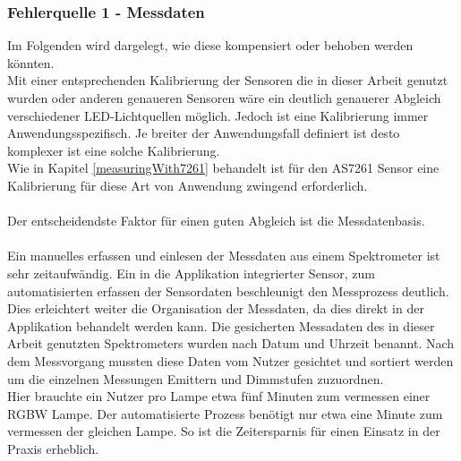 \documentclass[11pt]{scrartcl}
\begin{document}
\subsubsection{Fehlerquelle 1 - Messdaten}
Im Folgenden wird dargelegt, wie diese kompensiert oder behoben werden könnten.\\
Mit einer entsprechenden Kalibrierung der Sensoren die in dieser Arbeit genutzt wurden oder anderen genaueren
Sensoren wäre ein deutlich genauerer Abgleich verschiedener LED-Lichtquellen möglich. Jedoch ist eine
Kalibrierung immer Anwendungsspezifisch. Je breiter der Anwendungsfall definiert ist desto komplexer ist
eine solche Kalibrierung.\\
Wie in Kapitel \ref{measuringWith7261} behandelt ist für den AS7261 Sensor eine Kalibrierung für diese Art von
Anwendung zwingend erforderlich.\\
\\
Der entscheidendste Faktor für einen guten Abgleich ist die Messdatenbasis.\\
\\
Ein manuelles erfassen und einlesen der Messdaten aus einem Spektrometer ist sehr zeitaufwändig. Ein in die
Applikation integrierter Sensor, zum automatisierten erfassen der Sensordaten beschleunigt den Messprozess
deutlich. Dies erleichtert weiter die Organisation der Messdaten, da dies direkt in der Applikation behandelt
werden kann. Die gesicherten Messadaten des in dieser Arbeit genutzten Spektrometers wurden nach Datum und
Uhrzeit benannt. Nach dem Messvorgang mussten diese Daten vom Nutzer gesichtet und sortiert werden um die
einzelnen Messungen Emittern und Dimmstufen zuzuordnen.\\
Hier brauchte ein Nutzer pro Lampe etwa fünf Minuten zum vermessen einer RGBW Lampe. Der automatisierte Prozess
benötigt nur etwa eine Minute zum vermessen der gleichen Lampe. So ist die Zeitersparnis für einen Einsatz in der
Praxis erheblich.
\end{document}
